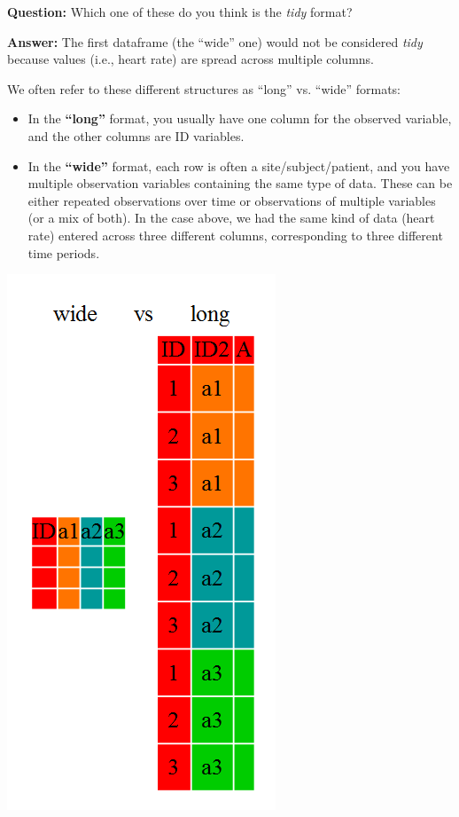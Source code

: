\documentclass[]{book}
\begin{document}
\textbf{Question:} Which one of these do you think is the \emph{tidy}
format?

\textbf{Answer:} The first dataframe (the ``wide'' one) would not be
considered \emph{tidy} because values (i.e., heart rate) are spread
across multiple columns.

We often refer to these different structures as ``long'' vs. ``wide''
formats:

\begin{itemize}
\item
  In the \textbf{``long''} format, you usually have one column for the
  observed variable, and the other columns are ID variables.
\item
  In the \textbf{``wide''} format, each row is often a
  site/subject/patient, and you have multiple observation variables
  containing the same type of data. These can be either repeated
  observations over time or observations of multiple variables (or a mix
  of both). In the case above, we had the same kind of data (heart rate)
  entered across three different columns, corresponding to three
  different time periods.
\end{itemize}

\begin{center}\includegraphics[width=0.7\linewidth]{img/tidyr-fig1} \end{center}
\end{document}
